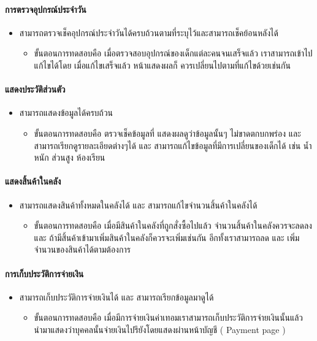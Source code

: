 \paragraph{การตรวจอุปกรณ์ประจำวัน}
\begin{itemize}
    \item สามารถตรวจเช็คอุปกรณ์ประจำวันได้ครบถ้วนตามที่ระบุไว้และสามารถเช็คย้อนหลังได้
    \begin{itemize}
        \item ขั้นตอนการทดสอบคือ เมื่อตรวจสอบอุปกรณ์ของเด็กแต่ละคนจนเสร็จแล้ว  เราสามารถเข้าไปแก้ไขได้โดย  เมื่อแก้ไขเสร็จแล้ว  
        หน้าแสดงผลก็  ควรเปลี่ยนไปตามที่แก้ไขด้วยเช่นกัน        
    \end{itemize}
\end{itemize}
\paragraph{แสดงประวัติส่วนตัว}
\begin{itemize}
    \item สามารถแสดงข้อมูลได้ครบถ้วน
    \begin{itemize}
        \item ขั้นตอนการทดสอบคือ ตรวจเช็คข้อมูลที่  แสดงผลดูว่าข้อมูลนั้นๆ ไม่ขาดตกบกพร่อง และ สามารถเรียกดูรายละเอียดต่างๆได้
        และ สามารถแก้ไขข้อมูลที่มีการเปลี่ยนของเด็กได้ เช่น น้ำหนัก  ส่วนสูง  ห้องเรียน         
    \end{itemize}
\end{itemize}
\paragraph{แสดงสิ้นค้าในคลัง}
\begin{itemize}
    \item สามารถแสดงสินค้าทั้งหมดในคลังได้ และ สามารถแก้ไขจํานวนสิ้นค้าในคลังได้
    \begin{itemize}
        \item ขั้นตอนการทดสอบคือ  เมื่อมีสินค้าในคลังที่ถูกสั่งซื้อไปแล้ว จำนวนสิ้นค้าในคลังควรจะลดลง และ  ถ้ามีสิ้นค้าเข้ามาเพิ่มสินค้าในคลังก็ควรจะเพิ่มเช่นกัน  อีกทั้งเราสามารถลด และ เพิ่มจำนวนของสินค้าได้ตามต้องการ 	
    \end{itemize}
\end{itemize}
\paragraph{การเก็บประวัติการจ่ายเงิน}
\begin{itemize}
    \item สามารถเก็บประวัติการจ่ายเงินได้ และ สามารถเรียกข้อมูลมาดูได้
    \begin{itemize}
        \item ขั้นตอนการทดสอบคือ เมื่อมีการจ่ายเงินค่าเทอมเราสามารถเก็บประวัติการจ่ายเงินนั้นแล้ว  นำมาแสดงว่าบุคคลนั้นจ่ายเงินไปรึยังโดยแสดงผ่านหน้าบัญชี ( Payment page )
    \end{itemize}
\end{itemize}



